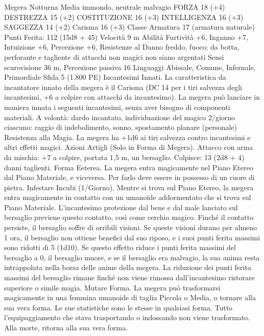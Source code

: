 \begin{multicols}{2}
Megera Notturna
Media immondo, neutrale malvagio
FORZA 18 (+4)
DESTREZZA 15 (+2)
COSTITUZIONE 16 (+3)
INTELLIGENZA 16 (+3)
SAGGEZZA 14 (+2)
Carisma 16 (+3)
Classe Armatura 17 (armatura naturale)
\hspace*{0pt}\hfill{Punti Ferita}: 112 (15d8 + 45)
Velocità 9 m
Abilità Furtività +6, Inganno +7, Intuizione +6, Percezione +6,
Resistenze al Danno freddo, fuoco; da botta, perforante e
tagliente di attacchi non magici non siano argentati
Sensi scurovisione 36 m, Percezione passiva 16
Linguaggi Abissale, Comune, Infernale, Primordiale
Sfida 5 (1.800 PE)
Incantesimi Innati. La caratteristica da incantatore innato della
megera è il Carisma (DC 14 per i tiri salvezza degli incantesimi,
+6 a colpire con attacchi da incantesimo). La megera può
lanciare in maniera innata i seguenti incantesimi, senza aver
bisogno di componenti materiali.
A volontà: dardo incantato, individuazione del magico
2/giorno ciascuno: raggio di indebolimento, sonno, spostamento
planare (personale)
Resistenza alla Magia. La megera ha +1d6 ai tiri salvezza
contro incantesimi e altri effetti magici.
Azioni
Artigli (Solo in Forma di Megera). Attacco con arma da
mischia: +7 a colpire, portata 1,5 m, un bersaglio.
Colpisce: 13 (2d8 + 4) danni taglienti.
Forma Eeterea. La megera entra magicamente nel Piano Etereo
dal Piano Materiale, e viceversa. Per farlo deve essere in
possesso di un cuore di pietra.
Infestare Incubi (1/Giorno). Mentre si trova sul Piano Etereo, la
megera entra magicamente in contatto con un umanoide
addormentato che si trova sul Piano Materiale. L’incantesimo
protezione dal bene e dal male lanciato sul bersaglio previene questo
contatto, così come cerchio magico. Finché il contatto persiste, il
bersaglio soffre di orribili visioni. Se queste visioni durano per
almeno 1 ora, il bersaglio non ottiene benefici dal suo riposo, e i suoi
punti ferita massimi sono ridotti di 5 (1d10). Se questo effetto riduce
i punti ferita massimi del bersaglio a 0, il bersaglio muore, e se il
bersaglio era malvagio, la sua anima resta intrappolata nella borsa
delle anime della megera. La riduzione dei punti ferita massimi del
bersaglio rimane finché non viene rimossa dall’incantesimo ristorare
superiore o simile magia.
Mutare Forma. La megera può trasformarsi magicamente in una
femmina umanoide di taglia Piccola o Media, o tornare alla sua vera
forma. Le sue statistiche sono le stesse in qualsiasi forma. Tutto
l’equipaggiamento che stava trasportando o indossando non viene
trasformato. Alla morte, ritorna alla sua vera forma.
 

\end{multicols}
